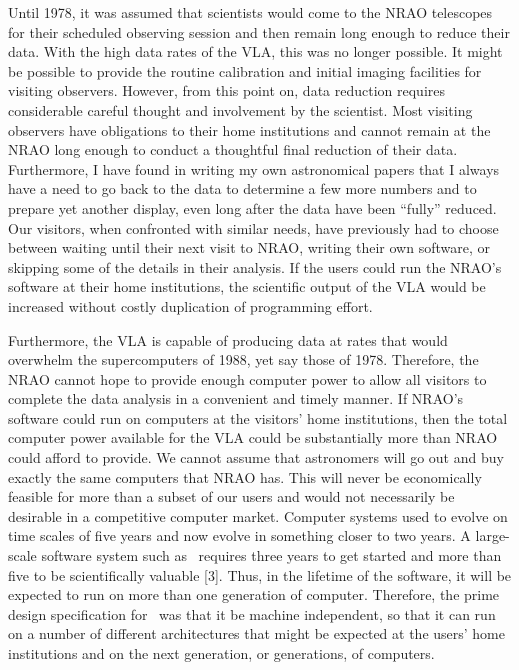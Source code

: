      Until 1978, it was assumed that scientists would come to the NRAO
telescopes for their scheduled observing session and then remain long
enough to reduce their data.  With the high data rates of the VLA, this
was no longer possible.  It might be possible to provide the routine
calibration and initial imaging facilities for visiting observers.
However, from this point on, data reduction requires considerable
careful thought and involvement by the scientist.  Most visiting observers
have obligations to their home institutions and cannot remain
at the NRAO long enough to conduct a thoughtful final reduction of their
data.  Furthermore, I have found in writing my own astronomical papers
that I always have a need to go back to the data to determine a few more
numbers and to prepare yet another display, even long after the data
have been ``fully'' reduced.  Our visitors, when confronted with similar
needs, have previously had to choose between waiting until their next visit
to NRAO, writing their own software, or skipping some of the details in
their analysis.  If the users could run the NRAO's software at their home
institutions, the scientific output of the VLA would be increased without
costly duplication of programming effort.

  Furthermore, the
VLA is capable of producing data at rates that would overwhelm the
supercomputers of 1988, yet say those of 1978.  Therefore, the NRAO
cannot hope to provide enough computer power to allow all visitors to
complete the data analysis in a convenient and timely manner.
If NRAO's software could run on computers at the visitors' home
institutions, then the total computer power available for the VLA
could be substantially more than NRAO could afford to provide.  We cannot
assume that astronomers will go out and buy exactly the same computers
that NRAO has.  This will never be economically feasible for more than
a subset of our users and would not necessarily be desirable in a
competitive computer market.  Computer systems used to evolve on time
scales of five years and now evolve in something closer to two years.
A large-scale software system such as \AIPS\ requires three years to
get started and more than five to be scientifically valuable [3].  Thus,
in the lifetime of the software, it will be expected to run on more than
one generation of computer.  Therefore, the prime design specification
for \AIPS\ was that it be machine independent, so that it can run on
a number of different architectures that might be expected at the
users' home institutions and on the next generation, or generations, of
computers.

